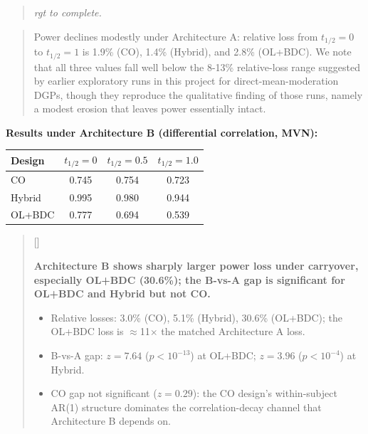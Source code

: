 \documentclass[
  11pt,
]{article}
\newcounter{pgraph}
\newenvironment{bullets}{%
  \stepcounter{pgraph}%
  \begin{quote}\small\sffamily\color[gray]{0.30}%
  {\normalfont\scriptsize\color[gray]{0.58}[\thepgraph]\enspace}}{%
  \end{quote}}
\newenvironment{rgt}{%
  \begin{quote}\small\itshape\color[RGB]{20,60,160}}{%
  \end{quote}}
\newenvironment{orig}{%
  \begin{quote}\normalsize\color[gray]{0.55}}{%
  \end{quote}}
\begin{document}
\begin{rgt}
rgt to complete.

\end{rgt}

\begin{orig}
Power declines modestly under Architecture A: relative loss from
\(t_{1/2} = 0\) to \(t_{1/2} = 1\) is 1.9\% (CO), 1.4\% (Hybrid), and
2.8\% (OL+BDC). We note that all three values fall well below the 8-13\%
relative-loss range suggested by earlier exploratory runs in this
project for direct-mean-moderation DGPs, though they reproduce the
qualitative finding of those runs, namely a modest erosion that leaves
power essentially intact.

\end{orig}

\textbf{Results under Architecture B (differential correlation,
MVN):}

\begin{table}[htbp]
\centering
\begin{tabular}{lccc}
\toprule
Design & $t_{1/2} = 0$ & $t_{1/2} = 0.5$ & $t_{1/2} = 1.0$ \\
\midrule
CO & 0.745 & 0.754 & 0.723 \\
Hybrid & 0.995 & 0.980 & 0.944 \\
OL+BDC & 0.777 & 0.694 & 0.539 \\
\bottomrule
\end{tabular}
\end{table}

\begin{bullets}

\textbf{Architecture B shows sharply larger power loss under
carryover, especially OL+BDC (30.6\%); the B-vs-A gap is
significant for OL+BDC and Hybrid but not CO.}

\begin{itemize}\setlength{\itemsep}{2pt}\setlength{\parskip}{0pt}
\item Relative losses: 3.0\% (CO), 5.1\% (Hybrid), 30.6\%
  (OL+BDC); the OL+BDC loss is $\approx$11$\times$ the
  matched Architecture A loss.
\item B-vs-A gap: $z = 7.64$ ($p < 10^{-13}$) at OL+BDC;
  $z = 3.96$ ($p < 10^{-4}$) at Hybrid.
\item CO gap not significant ($z = 0.29$): the CO design's
  within-subject AR(1) structure dominates the
  correlation-decay channel that Architecture B depends on.
\end{itemize}

\end{bullets}
\end{document}
